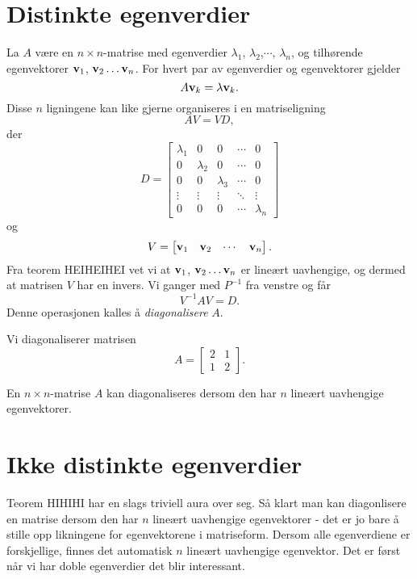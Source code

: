 

\label{ch:diagonalisering}
\section*{Distinkte egenverdier}
La $A$ være en $n \times n$-matrise med egenverdier $\lambda_1$, $\lambda_2$,$\cdots$, $\lambda_n$, og tilhørende egenvektorer $\mathbf{v}_1$, $\mathbf{v}_2\dots \mathbf{v}_n$. For hvert par av egenverdier og egenvektorer gjelder
\[
A\mathbf{v}_k=\lambda \mathbf{v}_k.
\]
Disse $n$ ligningene kan like gjerne organiseres i en matriseligning
\[
AV=VD, 
\]
der 
\[
D=
\begin{bmatrix}
\lambda_1      & 0      & 0      & \cdots & 0 \\
0      & \lambda_2      & 0      & \cdots & 0 \\
0      & 0      & \lambda_3      & \cdots & 0 \\
\vdots & \vdots & \vdots & \ddots & \vdots \\
0      & 0      & 0      & \cdots & \lambda_n
\end{bmatrix}
\]
og 
\[
V=
\begin{bmatrix}
\mathbf{v}_1 & \mathbf{v}_2 & \cdots & \mathbf{v}_n
\end{bmatrix}.
\]
Fra teorem HEIHEIHEI vet vi at $\mathbf{v}_1$, $\mathbf{v}_2\dots \mathbf{v}_n$ er lineært uavhengige, og dermed at matrisen $V$ har en invers. Vi ganger med $P^{-1}$ fra venstre og får
\[
V^{-1}AV=D.
\]
Denne operasjonen kalles å \emph{diagonalisere} $A$. 

\begin{ex}	
Vi diagonaliserer matrisen 
\[
A=
\begin{bmatrix}
2     & 1 \\
1      & 2
\end{bmatrix}.
\]
\end{ex}

\begin{thm}
En $n \times n$-matrise $A$ kan diagonaliseres dersom den har $n$ lineært uavhengige egenvektorer.
\end{thm}

\section*{Ikke distinkte egenverdier}
Teorem HIHIHI har en slags triviell aura over seg. Så klart man kan diagonlisere en matrise dersom den har $n$ lineært uavhengige egenvektorer - det er jo bare å stille opp likningene for egenvektorene i matriseform. Dersom alle egenverdiene er forskjellige, finnes det automatisk $n$ lineært uavhengige egenvektor. Det er først når vi har doble egenverdier det blir interessant.

